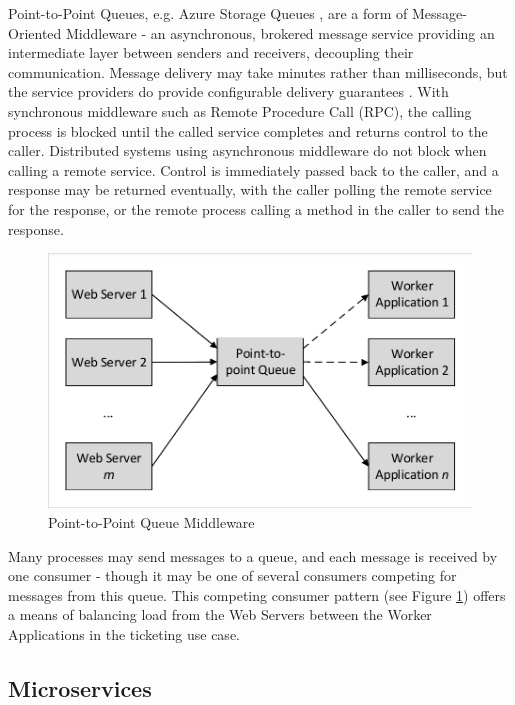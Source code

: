 Point-to-Point Queues, e.g. Azure Storage Queues \cite{RN1072}, are a form of Message-Oriented Middleware - an asynchronous, brokered message service providing an intermediate layer between senders and receivers, decoupling their communication.  Message delivery may take minutes rather than milliseconds, but the service providers do provide configurable delivery guarantees \cite{RN65}.  With synchronous middleware such as Remote Procedure Call (RPC), the calling process is blocked until the called service completes and returns control to the caller.  Distributed systems using asynchronous middleware do not block when calling a remote service.  Control is immediately passed back to the caller, and a response may be returned eventually, with the caller polling the remote service for the response, or the remote process calling a method in the caller to send the response.

\begin{figure}
	\caption{Point-to-Point Queue Middleware}
	\label{figure:queuemiddleware}
	\centering
	\includegraphics[trim = 5 5 5 5, clip, width=\textwidth]{img/p2pq}
\end{figure}

\FloatBarrier
Many processes may send messages to a queue, and each message is received by one consumer - though it may be one of several consumers competing for messages from this queue.  This competing consumer pattern (see Figure \ref{figure:queuemiddleware}) offers a means of balancing load from the Web Servers between the Worker Applications in the ticketing use case.

%
%
\FloatBarrier
\subsection{Microservices}\label{sec:microservices}

